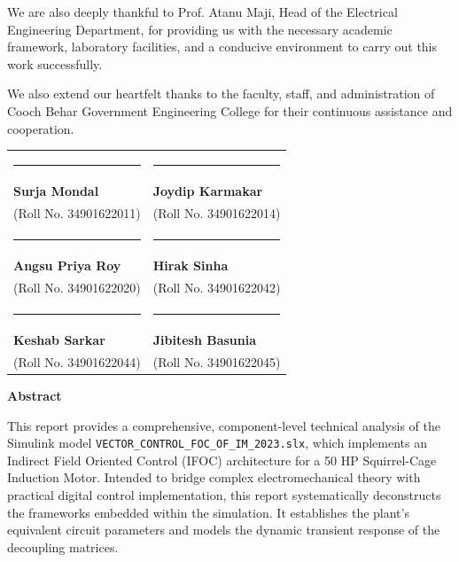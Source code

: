 \documentclass[12pt,a4paper]{report}
\begin{document}
We are also deeply thankful to Prof. Atanu Maji, Head of the Electrical Engineering Department, for providing us with the necessary academic framework, laboratory facilities, and a conducive environment to carry out this work successfully. 

We also extend our heartfelt thanks to the faculty, staff, and administration of Cooch Behar Government Engineering College for their continuous assistance and cooperation.

\vspace{2cm}
\begin{tabular}{@{}p{0.5\linewidth}p{0.5\linewidth}@{}}
\rule{6cm}{0.5pt} & \rule{6cm}{0.5pt} \\
\textbf{Surja Mondal} & \textbf{Joydip Karmakar} \\
(Roll No. 34901622011) & (Roll No. 34901622014) \\[2cm]

\rule{6cm}{0.5pt} & \rule{6cm}{0.5pt} \\
\textbf{Angsu Priya Roy} & \textbf{Hirak Sinha} \\
(Roll No. 34901622020) & (Roll No. 34901622042) \\[2cm]

\rule{6cm}{0.5pt} & \rule{6cm}{0.5pt} \\
\textbf{Keshab Sarkar} & \textbf{Jibitesh Basunia} \\
(Roll No. 34901622044) & (Roll No. 34901622045) \\
\end{tabular}

\newpage
\tableofcontents
\newpage
\listoffigures
\newpage
\listoftables

\newpage
\begin{center}
{\Large \bfseries Abstract\par}
\end{center}
\vspace{1cm}
This report provides a comprehensive, component-level technical analysis of the Simulink model \texttt{VECTOR\_CONTROL\_FOC\_OF\_IM\_2023.slx}, which implements an Indirect Field Oriented Control (IFOC) architecture for a 50 HP Squirrel-Cage Induction Motor. Intended to bridge complex electromechanical theory with practical digital control implementation, this report systematically deconstructs the frameworks embedded within the simulation. It establishes the plant's equivalent circuit parameters and models the dynamic transient response of the decoupling matrices. 
\end{document}

